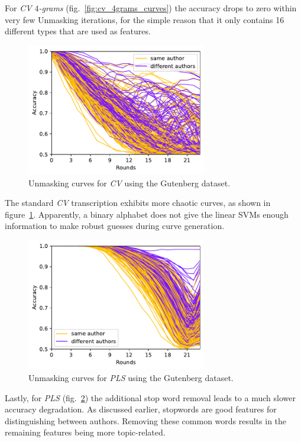 For \textit{CV $4$-grams} (fig.~\ref{fig:cv_4grams_curves}) the accuracy drops to zero within very few Unmasking iterations, for the simple reason that it only contains 16 different types that are used as features.
\begin{figure}
  \centering
  \includegraphics[width=0.7\textwidth]{figures/cv_curves}
  \caption{Unmasking curves for \textit{CV} using the Gutenberg dataset.}
  \label{fig:cv_curves}
\end{figure}
The standard \textit{CV} transcription exhibits more chaotic curves, as shown in figure~\ref{fig:cv_curves}.
Apparently, a binary alphabet does not give the linear SVMs enough information to make robust guesses during curve generation.
\begin{figure}
  \centering
  \includegraphics[width=0.7\textwidth]{figures/pls_curves}
  \caption{Unmasking curves for \textit{PLS} using the Gutenberg dataset.}
  \label{fig:pls_curves}
\end{figure}
Lastly, for \textit{PLS} (fig.~\ref{fig:pls_curves}) the additional stop word removal leads to a much slower accuracy degradation.
As discussed earlier, stopwords are good features for distinguishing between authors.
Removing these common words results in the remaining features being more topic-related.
